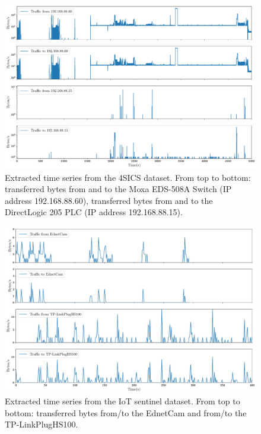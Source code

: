 \begin{figure}[!h]
\vspace{-5mm}
    \centering
   \includegraphics[width=\textwidth]{images/preprocessing/ts_4sics.pdf}
    \caption{Extracted time series from the 4SICS dataset. From top to bottom: transferred bytes from and to the Moxa EDS-508A Switch (IP address 192.168.88.60), transferred bytes from and to the DirectLogic 205 PLC (IP address 192.168.88.15).}
    \label{fig:ts_example_4sics}
    \vspace{-3mm}
\end{figure}
\begin{figure}[!h]
    \centering
       \includegraphics[width=\textwidth]{images/preprocessing/ts_iot.pdf}
    \caption{Extracted time series from the IoT sentinel dataset. From top to bottom: transferred bytes from/to the EdnetCam and from/to the TP-LinkPlugHS100.}
    \label{fig:ts_example_iot}
    \vspace{-5mm}
\end{figure}



